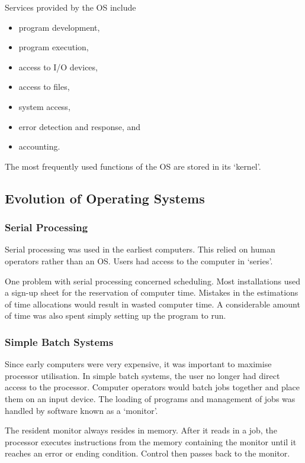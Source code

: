 Services provided by the OS include
\begin{itemize}
  \item program development,
  \item program execution,
  \item access to I/O devices,
  \item access to files,
  \item system access,
  \item error detection and response, and
  \item accounting.
\end{itemize}
The most frequently used functions of the OS are stored in its `kernel'.

\subsection{Evolution of Operating Systems}

\subsubsection{Serial Processing}

Serial processing was used in the earliest computers.
This relied on human operators rather than an OS.
Users had access to the computer in `series'.

One problem with serial processing concerned scheduling.
Most installations used a sign-up sheet for the reservation of computer time.
Mistakes in the estimations of time allocations would result in wasted computer time.
A considerable amount of time was also spent simply setting up the program to run.

\subsubsection{Simple Batch Systems}

Since early computers were very expensive, it was important to maximise processor utilisation.
In simple batch systems, the user no longer had direct access to the processor.
Computer operators would batch jobs together and place them on an input device.
The loading of programs and management of jobs was handled by software known as a `monitor'.

The resident monitor always resides in memory.
After it reads in a job, the processor executes instructions from the memory containing the monitor until it reaches an error or ending condition.
Control then passes back to the monitor.


